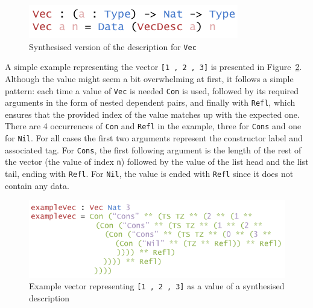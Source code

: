 \documentclass{ituthesis}
\newcommand{\ttconstructor}[1]{\textcolor{constructor-color}{\texttt{#1}}}
\newcommand{\tttype}[1]{\textcolor{type-color}{\texttt{#1}}}
\newcommand{\ttdec}[1]{\textcolor{declared-var-color}{\texttt{#1}}}
\newcommand{\ttvar}[1]{\textcolor{local-var-color}{\texttt{#1}}}
\newcommand{\ttliteral}[1]{\textcolor{literal-color}{\texttt{#1}}}
\theoremstyle{break}
\begin{document}
\begin{figure}[ht]
\begin{center}
    \includegraphics[scale=0.5]{Figures/VectorSynthesisedDesc.png}
\end{center}
\caption{Synthesised version of the description for \tttype{Vec}}
\label{fig:synthversvecdesc}
\end{figure}

A simple example representing the vector \ttconstructor{[}\ttliteral{1}~\ttconstructor{,}~\ttliteral{2}~\ttconstructor{,}~\ttliteral{3}\ttconstructor{]} is presented in Figure~\ref{fig:exmvecsynthvecdesc}. Although the value might seem a bit overwhelming at first, it follows a simple pattern:
each time a value of \ttdec{Vec} is needed \ttconstructor{Con} is used, followed by its required arguments in the form of nested dependent pairs, and finally with \ttconstructor{Refl}, which ensures
that the provided index of the value matches up with the expected one.
There are 4 occurrences of \ttconstructor{Con} and \ttconstructor{Refl} in the example, three for  \ttconstructor{Cons} and one for \ttconstructor{Nil}.
For all cases the first two arguments represent the constructor label and associated tag. 
For \ttconstructor{Cons}, the first following argument is the length of the rest of the vector (the value of index \ttvar{n}) followed by the value of the list head and the list tail, ending with \ttconstructor{Refl}.
For \ttconstructor{Nil}, the value is ended with \ttconstructor{Refl} since it does not contain any data.


\begin{figure}[ht]
\begin{center}
    \includegraphics[scale=0.5]{Figures/VectorSynthesisedExample.png}
\end{center}
\caption{Example vector representing \ttconstructor{[}\ttliteral{1}~\ttconstructor{,}~\ttliteral{2}~\ttconstructor{,}~\ttliteral{3}\ttconstructor{]} as a value of a synthesised description}
\label{fig:exmvecsynthvecdesc}
\end{figure}
\end{document}
